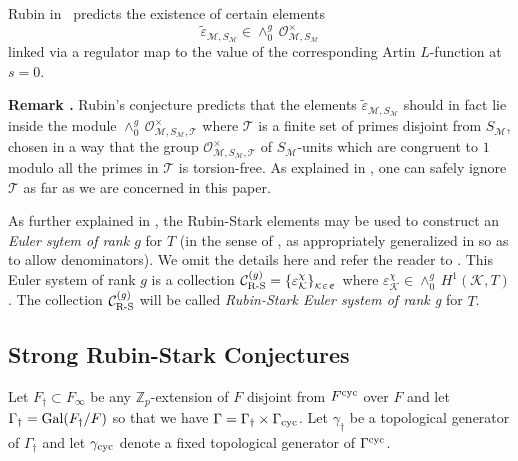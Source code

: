 \documentclass[12pt]{amsart}
\numberwithin{equation}{section}
\newenvironment{rem}{\par\medskip\noindent\refstepcounter{thm}
\bgroup{\hspace*{-0.15 cm}\bf{Remark} \thethm.}\bgroup}{\egroup
\egroup\par\medskip} \parskip 2pt
\begin{document}
Rubin in~\cite[Conjecture $\textup{B}^{\prime}$]{ru96} predicts the existence of certain elements 
$$\tilde{\varepsilon}_{\mathcal{M},S_\mathcal{M}} \in {\wedge^g_0}\, \mathcal{O}_{\mathcal{M},S_\mathcal{M}}^{\times}$$ 
linked via a regulator map to the value of the corresponding Artin $L$-function at $s=0$.
\begin{rem}\label{rem:T}
Rubin's conjecture predicts that the elements $\tilde{\varepsilon}_{\mathcal{M},S_\mathcal{M}}$ should in fact lie inside  the module ${\wedge^g_0}\, \mathcal{O}_{\mathcal{M},S_\mathcal{M},\mathcal{T}}^{\times}$ where $\mathcal{T}$ is a finite set of primes disjoint from $S_\mathcal{M}$, chosen in a way that the group $\mathcal{O}_{\mathcal{M},S_\mathcal{M},\mathcal{T}}^{\times}$ of $S_\mathcal{M}$-units which are congruent to $1$ modulo all the primes in $\mathcal{T}$ is torsion-free. As explained in \cite[Remark 3.1]{kbbiwasawa}, one can safely ignore $\mathcal{T}$ as far as we are concerned in this paper.
\end{rem}

As further explained in \cite[\S3.1]{kbbCMabvar}, the Rubin-Stark elements may be used to construct an \emph{Euler sytem of rank $g$} for $T$ (in the sense of \cite{pr-es}, as appropriately generalized in \cite{kbbesrankr} so as to allow denominators). We omit the details here and refer the reader to \cite{kbbCMabvar}. This Euler system of rank $g$ is a collection $\mathcal{C}^{(g)}_{\textup{R-S}}=\{\varepsilon_{\mathcal{K}}^{\chi}\}_{_{{\mathcal{K}}\in \frak{E}}}$ where $\varepsilon_{\mathcal{K}}^{\chi}\in \wedge^g_0\, H^1({\mathcal{K}},T)$.
The collection $\mathcal{C}^{(g)}_{\textup{R-S}}$ will be called \emph{Rubin-Stark Euler system of rank g} for $T$.
\subsection{Strong Rubin-Stark Conjectures}
\label{subset:strongRS}
Let $F_\dagger \subset F_\infty$ be any ${\mathbb{Z}}_p$-extension of $F$ disjoint from $F^{\textup{cyc}}$ over $F$ and let $\Gamma_\dagger=\textup{Gal}(F_\dagger/F)$ so that we have $\Gamma=\Gamma_\dagger\times\Gamma_{\textup{cyc}}$. Let $\gamma_\dagger$ be a topological generator of $\Gamma_\dagger$ and let $\gamma_{\textup{cyc}}$ denote a fixed topological generator of $\Gamma^{\textup{cyc}}$.
\end{document}
